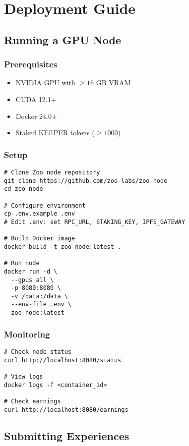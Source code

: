 \documentclass[11pt,a4paper]{article}
\begin{document}
\section{Deployment Guide}

\subsection{Running a GPU Node}

\subsubsection{Prerequisites}
\begin{itemize}
\item NVIDIA GPU with $\geq 16$ GB VRAM
\item CUDA 12.1+
\item Docker 24.0+
\item Staked KEEPER tokens ($\geq 1000$)
\end{itemize}

\subsubsection{Setup}
\begin{verbatim}
# Clone Zoo node repository
git clone https://github.com/zoo-labs/zoo-node
cd zoo-node

# Configure environment
cp .env.example .env
# Edit .env: set RPC_URL, STAKING_KEY, IPFS_GATEWAY

# Build Docker image
docker build -t zoo-node:latest .

# Run node
docker run -d \
  --gpus all \
  -p 8080:8080 \
  -v /data:/data \
  --env-file .env \
  zoo-node:latest
\end{verbatim}

\subsubsection{Monitoring}
\begin{verbatim}
# Check node status
curl http://localhost:8080/status

# View logs
docker logs -f <container_id>

# Check earnings
curl http://localhost:8080/earnings
\end{verbatim}

\subsection{Submitting Experiences}
\end{document}
